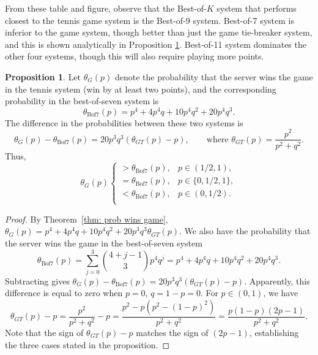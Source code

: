 \documentclass[11pt]{article}
\theoremstyle{plain}
\theoremstyle{definition}
\newtheorem{proposition}[theorem]{Proposition}
\begin{document}
From these table and figure, observe that the Best-of-$K$ system that performs closest to the tennis game system is the Best-of-9 system. Best-of-7 system is inferior to the game system, though better than just the game tie-breaker system, and this is shown analytically in Proposition \ref{prop: Best_of-7 System inferior to Game System}. Best-of-11 system dominates the other four systems, though this will also require playing more points.

\begin{proposition}
\label{prop: Best_of-7 System inferior to Game System}
    Let $\theta_G(p)$ denote the probability that the server wins the game in the tennis system (win by at least two points), and the corresponding probability in the best-of-seven system is 
    $$\theta_{\mathrm{Bof7}}(p) = p^4 + 4p^4q + 10p^4q^2 + 20p^4q^3.$$
    The difference in the probabilities between these two systems is
    \[ 
    \theta_G(p) - \theta_{\mathrm{Bof7}}(p) = 20p^3q^3\left( \theta_{GT}(p) - p \right), \qquad \text{where } \theta_{GT}(p) = \frac{p^2}{p^2+q^2}.
    \]
   Thus,
    \[
    \theta_G(p)
    \begin{cases}
    > \theta_{\mathrm{Bof7}}(p), & p \in (1/2, 1),\\
    = \theta_{\mathrm{Bof7}}(p), & p \in \{0, 1/2, 1\},\\
    < \theta_{\mathrm{Bof7}}(p), & p \in (0, 1/2).\\
    \end{cases}
    \]
\end{proposition}
%
\begin{proof}
    By Theorem~\ref{thm: prob wins game}, $\theta_G(p) = p^4 + 4p^4 q + 10p^4 q^2 + 20p^3 q^3 \theta_{GT}(p).$ We also have the probability that the server wins the game in the best-of-seven system
    \[
        \theta_{\mathrm{Bof7}}(p) = \sum_{j=0}^3 {{4+j-1} \choose 3} p^4 q^j = p^4 + 4p^4q + 10p^4q^2 + 20p^4q^3.
    \]
    Subtracting gives $\theta_G(p) - \theta_{\mathrm{Bof7}}(p) = 20p^3q^3(\theta_{GT}(p)-p)$. Apparently, this difference is equal to zero when $p = 0$, $q = 1-p = 0$. 
    For $p \in (0,1)$, we have
    \[
    \theta_{GT}(p)-p = \frac{p^2}{p^2+q^2}-p
    = \frac{p^2-p(p^2-(1-p)^2)}{p^2+q^2}
    =  \frac{p(1-p)(2p-1)}{p^2+q^2}.
    \]
    Note that the sign of $\theta_{GT}(p)-p$ matches the sign of $(2p-1)$, establishing the three cases stated in the proposition.
\end{proof}
\end{document}
